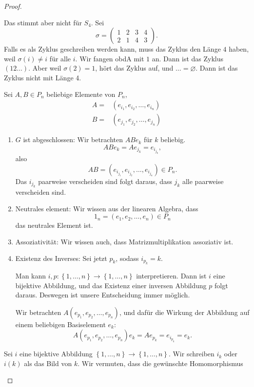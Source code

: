 \begin{proof}
\begin{parts}
		Das stimmt aber nicht f\"{u}r $S_4$. Sei
		\[
			\sigma=\begin{pmatrix} 1 & 2 & 3 & 4\\ 2 & 1 & 4 & 3 \end{pmatrix} 
		.\] 
		Falls es als Zyklus geschreiben werden kann, muss das Zyklus den Länge $4$ haben, weil $\sigma(i)\neq i$ f\"{u}r alle $i$. Wir fangen obdA mit $1$ an. Dann ist das Zyklus $(12\dots)$. Aber weil $\sigma(2)=1$, hört das Zyklus auf, und $\dots=\varnothing$. Dann ist das Zyklus nicht mit Länge 4. 
	\item Sei $A,B\in P_n$ beliebige Elemente von $P_n$,
		\begin{align*}
			A=&(e_{i_1},e_{i_2},\dots, e_{i_n})\\
			B=&(e_{j_1},e_{j_2},\dots, e_{j_n})
		\end{align*}
		\begin{enumerate}[label=(\roman*)]
			\item $G$ ist abgeschlossen: Wir betrachten $ABe_k$ f\"{u}r $k$ beliebig.
				\[
					ABe_k=Ae_{j_k}=e_{i_{j_k}}
				,\]
				also
				\[
					AB=(e_{i_{j_1}},e_{i_{j_2}},\dots,e_{i_{j_n}})\in P_n
				.\] 
				Das $i_{j_k}$ paarweise verscheiden sind folgt daraus, dass $j_k$ alle paarweise verscheiden sind.
			\item Neutrales element: Wir wissen aus der linearen Algebra, dass
				 \[
				1_n=(e_1,e_2,\dots, e_n)\in P_n
				\]
				das neutrales Element ist.
			\item Assoziativität: Wir wissen auch, dass Matrizmultiplikation assoziativ ist.
			\item Existenz des Inverses: Sei jetzt $p_k$, sodass $i_{p_k}=k$. 
				\begin{tcolorbox}[title=Bemerkung]
					Man kann $i,p: \left\{ 1,\dots,n \right\} \to \left\{ 1,\dots,n \right\} $ interpretieren. Dann ist $i$ eine bijektive Abbildung, und das Existenz einer inversen Abbildung $p$ folgt daraus. Deswegen ist unsere Entscheidung immer möglich.
				\end{tcolorbox}
				Wir betrachten $A(e_{p_1},e_{p_2},\dots, e_{p_n})$, und dafür die Wirkung der Abbildung auf einem beliebigen Basiselement $e_k$: 
\[
	A(e_{p_1},e_{p_2},\dots,e_{p_n})e_k=Ae_{p_k}=e_{i_{p_k}}=e_k
.\] 
		\end{enumerate}
	\item Sei $i$ eine bijektive Abbildung $\left\{ 1,\dots,n \right\}\to \left\{ 1,\dots,n \right\} $. Wir schreiben $i_k$ oder $i(k)$ als das Bild von $k$. Wir vermuten, dass die gewünschte Homomorphismus

\end{parts}
\end{proof}
